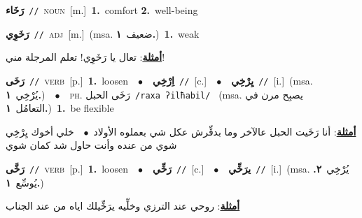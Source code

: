 \documentclass[10pt,a4paper,twoside]{article} %
\begin{document}
\begin{multicols}{2}
{\setlength\topsep{0pt}\textbf{\foreignlanguage{arabic}{رَخَاء}}\ {\color{gray}\texttt{//}\color{black}}\ \textsc{noun}\ [m.]\ \textbf{1.}~comfort  \textbf{2.}~well-being\ } \vspace{2mm}

{\setlength\topsep{0pt}\textbf{\foreignlanguage{arabic}{رَخَوِي}}\ {\color{gray}\texttt{//}\color{black}}\ \textsc{adj}\ [m.]\ \color{gray}(msa. \foreignlanguage{arabic}{ضعيف}~\foreignlanguage{arabic}{\textbf{١.}})\color{black}\ \textbf{1.}~weak\  \begin{flushright}\color{gray}\foreignlanguage{arabic}{\textbf{\underline{\foreignlanguage{arabic}{أمثلة}}}: تعال يا رَخَوِي! تعلم المرجلة مني!}\end{flushright}\color{black}} \vspace{2mm}

{\setlength\topsep{0pt}\textbf{\foreignlanguage{arabic}{رَخَى}}\ {\color{gray}\texttt{//}\color{black}}\ \textsc{verb}\ [p.]\ \textbf{1.}~loosen\ \ $\bullet$\ \ \setlength\topsep{0pt}\textbf{\foreignlanguage{arabic}{اِرْخِي}}\ {\color{gray}\texttt{//}\color{black}}\ [c.]\ \ $\bullet$\ \ \setlength\topsep{0pt}\textbf{\foreignlanguage{arabic}{يِرْخِي}}\ {\color{gray}\texttt{//}\color{black}}\ [i.]\ \color{gray}(msa. \foreignlanguage{arabic}{يُرْخِي}~\foreignlanguage{arabic}{\textbf{١.}})\color{black}\ \ $\bullet$\ \ \textsc{ph.} \color{gray} \foreignlanguage{arabic}{رَخَى الحبل}\color{black}\ {\color{gray}\texttt{/{\sffamily raxa ʔilħabil}/}\color{black}}\ \color{gray} (msa. \foreignlanguage{arabic}{يصبِح مرن في التعامُل}~\foreignlanguage{arabic}{\textbf{١.}})\color{black}\ \textbf{1.}~be flexible\  \begin{flushright}\color{gray}\foreignlanguage{arabic}{\textbf{\underline{\foreignlanguage{arabic}{أمثلة}}}: أنا رَخَيت الحبل عالآخر وما بدقِّرش عكل شي بعملوه الأولاد\ $\bullet$\ \  خلي أخوك يِرْخِي شوي من عنده وأنت حاول شد كمان شوي}\end{flushright}\color{black}} \vspace{2mm}

{\setlength\topsep{0pt}\textbf{\foreignlanguage{arabic}{رَخَّى}}\ {\color{gray}\texttt{//}\color{black}}\ \textsc{verb}\ [p.]\ \textbf{1.}~loosen\ \ $\bullet$\ \ \setlength\topsep{0pt}\textbf{\foreignlanguage{arabic}{رَخِّي}}\ {\color{gray}\texttt{//}\color{black}}\ [c.]\ \ $\bullet$\ \ \setlength\topsep{0pt}\textbf{\foreignlanguage{arabic}{يرَخِّي}}\ {\color{gray}\texttt{//}\color{black}}\ [i.]\ \color{gray}(msa. \foreignlanguage{arabic}{يُرْخِي}~\foreignlanguage{arabic}{\textbf{٢.}}  \foreignlanguage{arabic}{يُوسِّع}~\foreignlanguage{arabic}{\textbf{١.}})\color{black}\  \begin{flushright}\color{gray}\foreignlanguage{arabic}{\textbf{\underline{\foreignlanguage{arabic}{أمثلة}}}: روحي عند الترزي وخلِّيه يرَخِّيلك اياه من عند الجناب}\end{flushright}\color{black}} \vspace{2mm}


\end{multicols}
\end{document}
